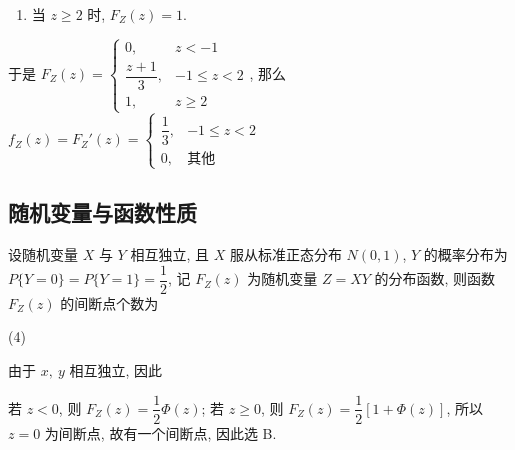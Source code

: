 \begin{solution}
\begin{enumerate}[label=(\arabic{*})]
\begin{enumerate}[label=(\roman{*})]
                  \item 当 $z\geqslant 2$ 时, $F_Z(z)=1.$
              \end{enumerate}
              于是 $F_Z(z)=\begin{cases}
                      0,              & z<-1            \\
                      \dfrac{z+1}{3}, & -1\leqslant z<2 \\[6pt]
                      1,              & z\geqslant 2
                  \end{cases}$, 那么 $f_Z(z)=F_Z'(z)=\begin{cases}
                      \dfrac{1}{3}, & -1\leqslant z<2 \\
                      0,            & \text{其他}
                  \end{cases}$
    \end{enumerate}
\end{solution}

\subsection{随机变量与函数性质}

\begin{example}[2009 数一]
    设随机变量 $ X $ 与 $ Y $ 相互独立, 且 $ X $ 服从标准正态分布 $ N(0,1)$, $ Y $ 的概率分布为 $ P\{Y=0\}=   P\{Y=1\}=\dfrac{1}{2} $, 
    记 $ F_{Z}(z) $ 为随机变量 $ Z=X Y $ 的分布函数, 则函数 $ F_{Z}(z) $ 的间断点个数为
    \begin{tasks}(4)
    \end{tasks}
\end{example}
\begin{solution}
    由于 $x,~y$ 相互独立, 因此
    若 $z<0$, 则 $F_Z(z)=\dfrac{1}{2}\varPhi(z)$; 若 $z\geqslant 0$, 则 $F_Z(z)=\dfrac{1}{2}[1+\varPhi(z)]$, 所以 $z=0$ 为间断点, 故有一个间断点, 因此选 B.
\end{solution}
